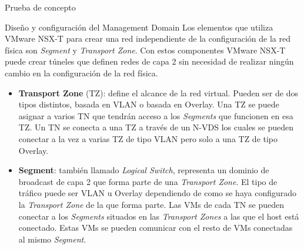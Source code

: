 \begin{section}{Prueba de concepto}
\begin{subsection}{Diseño y configuración del Management Domain}
    Los elementos que utiliza VMware NSX-T para crear una red independiente de la configuración de la red física son \textit{Segment} y \textit{Transport Zone}. Con estos componentes VMware NSX-T puede crear túneles que definen redes de capa 2 sin necesidad de realizar ningún cambio en la configuración de la red física.
    \begin{itemize}
      \item \textbf{Transport Zone} (TZ): define el alcance de la red virtual. Pueden ser de dos tipos distintos, basada en VLAN o basada en Overlay. Una TZ se puede asignar a varios TN que tendrán acceso a los \textit{Segments} que funcionen en esa TZ. Un TN se conecta a una TZ a través de un N-VDS los cuales se pueden conectar a la vez a varias TZ de tipo VLAN pero solo a una TZ de tipo Overlay.
      
      \item \textbf{Segment}: también llamado \textit{Logical Switch}, representa un dominio de broadcast de capa 2 que forma parte de una \textit{Transport Zone}. El tipo de tráfico puede ser VLAN u Overlay dependiendo de como se haya configurado la \textit{Transport Zone} de la que forma parte. Las VMs de cada TN se pueden conectar a los \textit{Segments} situados en las \textit{Transport Zones} a las que el host está conectado. Estas VMs se pueden comunicar con el resto de VMs conectadas al mismo \textit{Segment}.
       
    \end{itemize}
    

\end{subsection}
\end{section}
